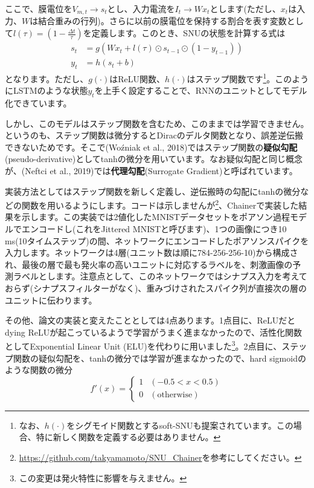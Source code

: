 ここで、膜電位を$V_{m, t} \to s_t$とし、入力電流を$I_{t} \to Wx_t$とします(ただし、$x_t$は入力、$W$は結合重みの行列)。さらに以前の膜電位を保持する割合を表す変数として$l(\tau)=(1-\frac{\Delta t}{\tau})$を定義します。このとき、SNUの状態を計算する式は
\begin{align} 
s_t&=g\left(Wx_t+l(\tau)\odot s_{t-1}\odot (1-y_{t-1})\right)\\
y_t&=h(s_t +b) 
\end{align}
となります。ただし、$g(\cdot)$はReLU関数、$h(\cdot)$はステップ関数です\footnote{なお、$h(\cdot)$をシグモイド関数とするsoft-SNUも提案されています。この場合、特に新しく関数を定義する必要はありません。}。このようにLSTMのような状態$y_t$を上手く設定することで、RNNのユニットとしてモデル化できています。\par
しかし、このモデルはステップ関数を含むため、このままでは学習できません。というのも、ステップ関数は微分するとDiracのデルタ関数となり、誤差逆伝搬できないためです。そこで(Woźniak et al., 2018)ではステップ関数の\textbf{疑似勾配}(pseudo-derivative)としてtanhの微分を用いています。なお疑似勾配と同じ概念が、(Neftci et al., 2019)では\textbf{代理勾配}(Surrogate Gradient)と呼ばれています。\par
実装方法としてはステップ関数を新しく定義し、逆伝搬時の勾配にtanhの微分などの関数を用いるようにします。コードは示しませんが\footnote{\url{https://github.com/takyamamoto/SNU_Chainer}を参考にしてください。}、Chainerで実装した結果を示します。この実装では2値化したMNISTデータセットをポアソン過程モデルでエンコードし(これをJittered MNISTと呼びます)、1つの画像につき10 ms(10タイムステップ)の間、ネットワークにエンコードしたポアソンスパイクを入力します。ネットワークは4層(ユニット数は順に784-256-256-10)から構成され、最後の層で最も発火率の高いユニットに対応するラベルを、刺激画像の予測ラベルとします。注意点として、このネットワークではシナプス入力を考えておらず(シナプスフィルターがなく)、重みづけされたスパイク列が直接次の層のユニットに伝わります。\par
その他、論文の実装と変えたこととしては4点あります。1点目に、ReLUだとdying ReLUが起こっているようで学習がうまく進まなかったので、活性化関数としてExponential Linear Unit (ELU)を代わりに用いました\footnote{この変更は発火特性に影響を与えません。}。2点目に、ステップ関数の疑似勾配を、tanhの微分では学習が進まなかったので、hard sigmoidのような関数の微分
\begin{equation}
f'(x) = \begin{cases} 1 & (-0.5<x<0.5) \\ 0 & (\text{otherwise}) \end{cases}
\end{equation}
